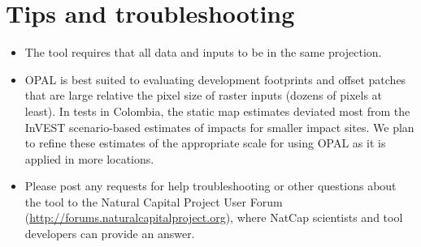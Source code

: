 \documentclass[11pt,letterpaper]{report}
\begin{document}
\chapter{Tips and troubleshooting}
	
	\begin{itemize}
		\item The tool requires that all data and inputs to be in the same projection. 
		
		\item OPAL is best suited to evaluating development footprints and offset patches that are large relative the pixel size of raster inputs (dozens of pixels at least). In tests in Colombia, the static map estimates deviated most from the InVEST scenario-based estimates of impacts for smaller impact sites. We plan to refine these estimates of the appropriate scale for using OPAL as it is applied in more locations.
		
		\item Please post any requests for help troubleshooting or other questions about the tool to the Natural Capital Project User Forum (\url{http://forums.naturalcapitalproject.org}), where NatCap scientists and tool developers can provide an answer.
	\end{itemize}
\end{document}
